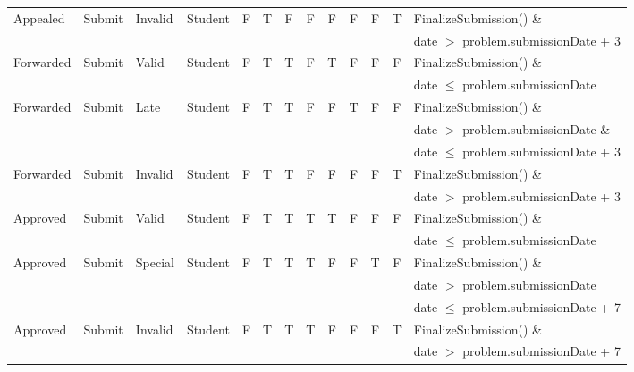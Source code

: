 \documentclass{article}
\begin{document}
\begin{enumerate}
\begin{center}
\begin{scriptsize}
\begin{tabular}{|l|l|l|l|c|c|c|c|c|c|c|c|p{4cm}|}
\textsf{Appealed}		& Submit	 & \textsf{Invalid} & Student	& F	& T & F & F & F & F & F & T & FinalizeSubmission() \& \\
&&&&&&&&&&&& \textsf{date} $>$ \textsf{problem.submissionDate} + 3 \\ \hline

\textsf{Forwarded}		& Submit	 & \textsf{Valid} & Student	& F	& T & T & F & T & F & F & F & FinalizeSubmission() \& \\ 
&&&&&&&&&&&& \textsf{date} $\leq$ \textsf{problem.submissionDate} \\ \hline

\textsf{Forwarded}		& Submit	 & \textsf{Late} & Student	& F	& T & T & F & F & T & F & F & FinalizeSubmission() \& \\
&&&&&&&&&&&& \textsf{date} $>$ \textsf{problem.submissionDate} \& \\ 
&&&&&&&&&&&& \textsf{date} $\leq$ \textsf{problem.submissionDate} + 3 \\ \hline

\textsf{Forwarded}		& Submit	 & \textsf{Invalid} & Student	& F	& T & T & F & F & F & F & T & FinalizeSubmission() \& \\
&&&&&&&&&&&& \textsf{date} $>$ \textsf{problem.submissionDate} + 3 \\ \hline

\textsf{Approved}		& Submit	 & \textsf{Valid} & Student	& F	& T & T & T & T & F & F & F & FinalizeSubmission() \& \\ 
&&&&&&&&&&&& \textsf{date} $\leq$ \textsf{problem.submissionDate} \\ \hline

\textsf{Approved}		& Submit	 & \textsf{Special} & Student	& F	& T & T & T & F & F & T & F & FinalizeSubmission() \& \\
&&&&&&&&&&&& \textsf{date} $>$ \textsf{problem.submissionDate} \\ 
&&&&&&&&&&&& \textsf{date} $\leq$ \textsf{problem.submissionDate} + 7 \\ \hline

\textsf{Approved}		& Submit	 & \textsf{Invalid} & Student	& F	& T & T & T & F & F & F & T & FinalizeSubmission() \& \\
&&&&&&&&&&&& \textsf{date} $>$ \textsf{problem.submissionDate} + 7 \\ \hline


\end{tabular}
\end{scriptsize}
\end{center}
\end{enumerate}
\end{document}
